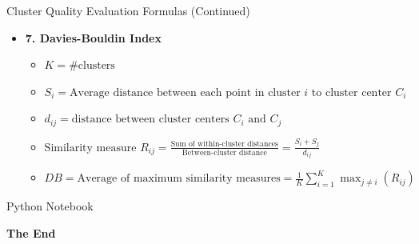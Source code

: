 \documentclass[aspectratio=169,xcolor=dvipsnames,svgnames,x11names,fleqn]{beamer}
\begin{document}
\begin{frame}{Cluster Quality Evaluation Formulas (Continued)}
    \begin{itemize}
        \item \textbf{7. Davies-Bouldin Index}
    \begin{itemize}
        \item $K = \text{\# clusters}$
        \item $S_i = \text{Average distance between each point in cluster } i \text{ to cluster center } C_i$
        \item $d_{ij} = \text{distance between cluster centers } C_i \text{ and } C_j$
\item $\text{Similarity measure } R_{ij} = \frac{\text{Sum of within-cluster distances}}{\text{Between-cluster distance}} = \frac{S_i + S_j}{d_{ij}}$
\item $DB = \text{Average of maximum similarity measures} = \frac{1}{K} \sum_{i=1}^{K} \max_{j \neq i} (R_{ij})$
    \end{itemize}
\end{itemize}
\end{frame}
    
    
    \begin{frame}[containsverbatim]{Python Notebook}
    \begin{center}
    \small
    { }
    \end{center}
    \end{frame}
    
    
    \begin{frame}
        \Huge{\centerline{\color{MediumBlue}\textbf{The End}}}
    \end{frame}
\end{document}
